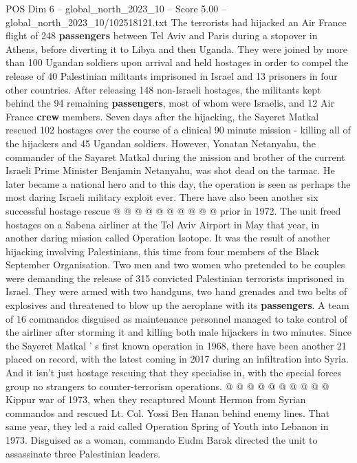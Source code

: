 \begin{textsample}{POS Dim 6 – global\_north\_2023\_10 – Score 5.00 – global\_north\_2023\_10/102518121.txt}  \label{ex:f6_pos_209}
The terrorists had hijacked an Air France flight of 248 \textbf{passengers} between Tel Aviv and Paris during a stopover in Athens, before diverting it to Libya and then Uganda.
They were joined by more than 100 Ugandan soldiers upon arrival and held hostages in order to compel the release of 40 Palestinian militants imprisoned in Israel and 13 prisoners in four other countries.
After releasing 148 non-Israeli hostages, the militants kept behind the 94 remaining \textbf{passengers}, most of whom were Israelis, and 12 Air France \textbf{crew} members.
Seven days after the hijacking, the Sayeret Matkal rescued 102 hostages over the course of a clinical 90 minute mission - killing all of the hijackers and 45 Ugandan soldiers.
However, Yonatan Netanyahu, the commander of the Sayaret Matkal during the mission and brother of the current Israeli Prime Minister Benjamin Netanyahu, was shot dead on the tarmac.
He later became a national hero and to this day, the operation is seen as perhaps the most daring Israeli military exploit ever.
There have also been another six successful hostage rescue @ @ @ @ @ @ @ @ @ @ prior in 1972.
The unit freed hostages on a Sabena airliner at the Tel Aviv Airport in May that year, in another daring mission called Operation Isotope.
It was the result of another hijacking involving Palestinians, this time from four members of the Black September Organisation.
Two men and two women who pretended to be couples were demanding the release of 315 convicted Palestinian terrorists imprisoned in Israel.
They were armed with two handguns, two hand grenades and two belts of explosives and threatened to blow up the aeroplane with its \textbf{passengers}.
A team of 16 commandos disguised as maintenance personnel managed to take control of the airliner after storming it and killing both male hijackers in two minutes.
Since the Sayeret Matkal ' s first known operation in 1968, there have been another 21 placed on record, with the latest coming in 2017 during an infiltration into Syria.
And it isn't just hostage rescuing that they specialise in, with the special forces group no strangers to counter-terrorism operations. @ @ @ @ @ @ @ @ @ @ Kippur war of 1973, when they recaptured Mount Hermon from Syrian commandos and rescued Lt.
Col.
Yossi Ben Hanan behind enemy lines.
That same year, they led a raid called Operation Spring of Youth into Lebanon in 1973.
Disguised as a woman, commando Eudm Barak directed the unit to assassinate three Palestinian leaders.

\end{textsample}
